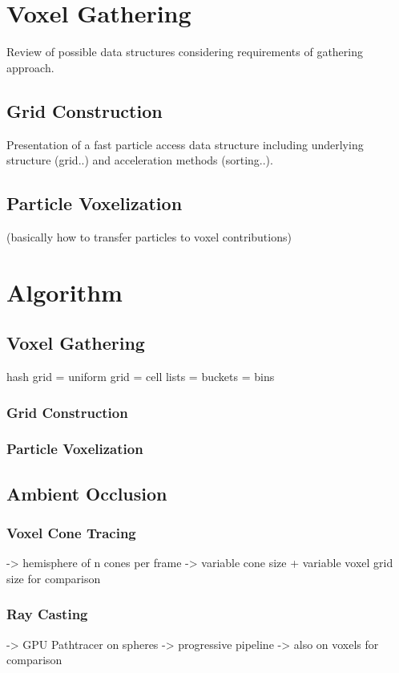 \documentclass[hyperref,german,diplominf]{cgvpub}
\begin{document}
\chapter{Voxel Gathering}
Review of possible data structures considering requirements of gathering approach.
\section{Grid Construction}
Presentation of a fast particle access data structure including underlying structure (grid..) and acceleration methods (sorting..).
\section{Particle Voxelization}
(basically how to transfer particles to voxel contributions)

\chapter{Algorithm}

\section{Voxel Gathering}

hash grid = uniform grid = cell lists = buckets = bins

\subsection{Grid Construction}

\subsection{Particle Voxelization}

\section{Ambient Occlusion}

\subsection{Voxel Cone Tracing}
-> hemisphere of n cones per frame
-> variable cone size + variable voxel grid size for comparison

\subsection{Ray Casting}
-> GPU Pathtracer on spheres
-> progressive pipeline
-> also on voxels for comparison
\end{document}
